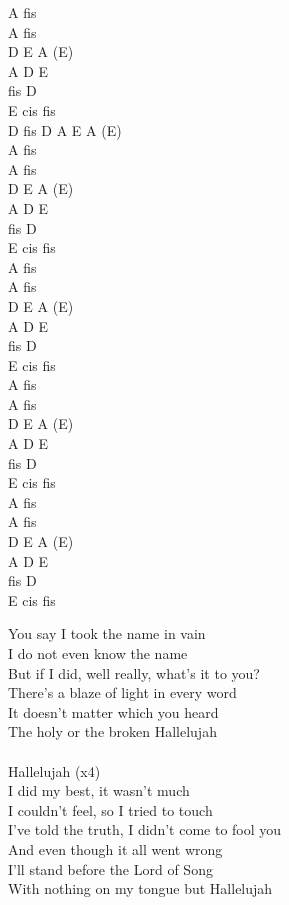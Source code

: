 \documentclass[a5paper, 10pt]{book}
\begin{document}
\begin{minipage}[t]{0.2\textwidth}
 A fis\\
 A fis\\
 D E A (E)\\
 A D E\\
 fis D\\
 E cis fis\\
 
 D fis D A E A (E)\\

  A fis\\
 A fis\\
 D E A (E)\\
 A D E\\
 fis D\\
 E cis fis\\

  A fis\\
 A fis\\
 D E A (E)\\
 A D E\\
 fis D\\
 E cis fis\\

  A fis\\
 A fis\\
 D E A (E)\\
 A D E\\
 fis D\\
 E cis fis\\

  A fis\\
 A fis\\
 D E A (E)\\
 A D E\\
 fis D\\
 E cis fis\\

\end{minipage}
\begin{minipage}[t]{0.8\textwidth}
You say I took the name in vain\\
I do not even know the name\\
But if I did, well really, what’s it to you?\\
There’s a blaze of light in every word\\
It doesn’t matter which you heard\\
The holy or the broken Hallelujah\\
\\
\hspace*{6mm}Hallelujah (x4)\\

I did my best, it wasn’t much\\
I couldn’t feel, so I tried to touch\\
I’ve told the truth, I didn’t come to fool you\\
And even though it all went wrong\\
I’ll stand before the Lord of Song\\
With nothing on my tongue but Hallelujah\\
\end{minipage}
\end{document}
